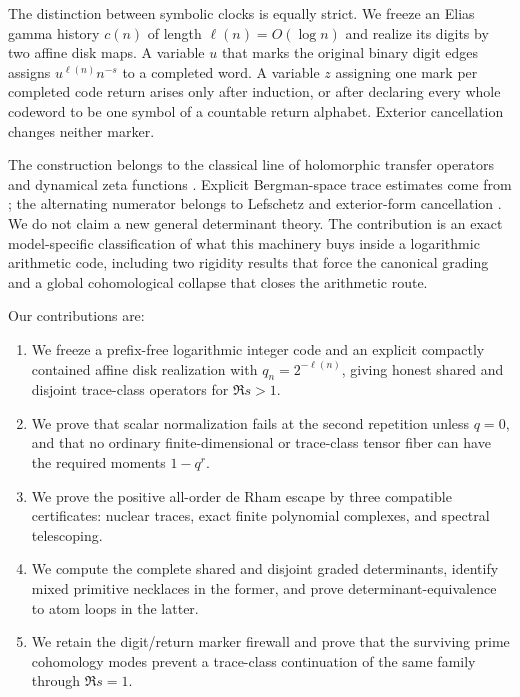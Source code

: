 The distinction between symbolic clocks is equally strict.  We freeze an
Elias gamma history \(c(n)\) of length \(\ell(n)=O(\log n)\) and realize its
digits by two affine disk maps.  A variable \(u\) that marks the original
binary digit edges assigns \(u^{\ell(n)}n^{-s}\) to a completed word.  A
variable \(z\) assigning one mark per completed code return arises only
after induction, or after declaring every whole codeword to be one symbol of
a countable return alphabet.  Exterior cancellation changes neither marker.

The construction belongs to the classical line of holomorphic transfer
operators and dynamical zeta functions
\citep{Ruelle1976,Ruelle1990}.  Explicit Bergman-space trace estimates come
from \citet{BandtlowJenkinson2008}; the alternating numerator belongs to
Lefschetz and exterior-form cancellation
\citep{AtiyahBott1967,HadfieldKandelSchiavina2020}.  We do not claim a new
general determinant theory.  The contribution is an exact model-specific
classification of what this machinery buys inside a logarithmic arithmetic
code, including two rigidity results that force the canonical grading and a
global cohomological collapse that closes the arithmetic route.

Our contributions are:
\begin{enumerate}
  \item We freeze a prefix-free logarithmic integer code and an explicit
  compactly contained affine disk realization with
  \(q_n=2^{-\ell(n)}\), giving honest shared and disjoint trace-class
  operators for \(\Re s>1\).
  \item We prove that scalar normalization fails at the second repetition
  unless \(q=0\), and that no ordinary finite-dimensional or trace-class
  tensor fiber can have the required moments \(1-q^r\).
  \item We prove the positive all-order de Rham escape by three compatible
  certificates: nuclear traces, exact finite polynomial complexes, and
  spectral telescoping.
  \item We compute the complete shared and disjoint graded determinants,
  identify mixed primitive necklaces in the former, and prove
  determinant-equivalence to atom loops in the latter.
  \item We retain the digit/return marker firewall and prove that the
  surviving prime cohomology modes prevent a trace-class continuation of
  the same family through \(\Re s=1\).
\end{enumerate}

